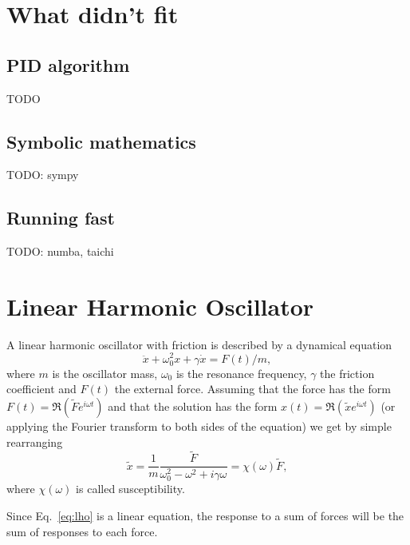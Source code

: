 \documentclass{article}
\newcommand{\ls}[1]{\lstinline{#1}}
\begin{document}

\newpage
\section{What didn't fit}

\subsection{PID algorithm}
TODO

\subsection{Symbolic mathematics}
TODO: sympy

\subsection{Running fast}
TODO: numba, taichi

\newpage
\appendix
\section{Linear Harmonic Oscillator}
\label{sec:lho}
A linear harmonic oscillator with friction is described by a dynamical equation
\begin{equation}
    \label{eq:lho}
    \ddot x + \omega_0^2 x + \gamma\dot x = F(t)/m,
\end{equation}
where $m$ is the oscillator mass, $\omega_0$ is the resonance frequency, $\gamma$ the friction coefficient and $F(t)$ the external force. Assuming that the force has the form $F(t) = \Re(\tilde F e^{i\omega t})$ and that the solution has the form $x(t) = \Re(\tilde x e^{i\omega t})$ (or applying the Fourier transform to both sides of the equation) we get by simple rearranging
\begin{equation}
    \tilde x = \frac{1}{m}\frac{\tilde F}{\omega_0^2 - \omega^2 + i\gamma\omega} = \chi(\omega)\tilde F,
\end{equation}
where $\chi(\omega)$ is called susceptibility.

Since Eq.~\ref{eq:lho} is a linear equation, the response to a sum of forces will be the sum of responses to each force.
\end{document}
